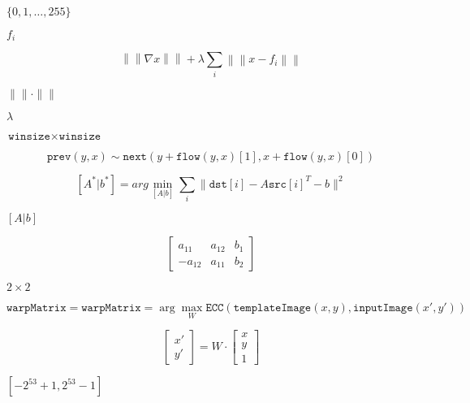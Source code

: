\documentclass{article}
\begin{document}
$\{0,1,\dots,255\}$
\pagebreak

$f_i$
\pagebreak

\[\left\|\left\|\nabla x\right\|\right\| + \lambda\sum_i\left\|\left\|x-f_i\right\|\right\|\]
\pagebreak

$\|\|\cdot\|\|$
\pagebreak

$\lambda$
\pagebreak

$\texttt{winsize}\times\texttt{winsize}$
\pagebreak

\[\texttt{prev} (y,x) \sim \texttt{next} ( y + \texttt{flow} (y,x)[1], x + \texttt{flow} (y,x)[0])\]
\pagebreak

\[[A^*|b^*] = arg \min _{[A|b]} \sum _i \| \texttt{dst}[i] - A { \texttt{src}[i]}^T - b \| ^2\]
\pagebreak

$[A|b]$
\pagebreak

\[\begin{bmatrix} a_{11} & a_{12} & b_1 \\ -a_{12} & a_{11} & b_2 \end{bmatrix}\]
\pagebreak

$2\times 2$
\pagebreak

\[\texttt{warpMatrix} = \texttt{warpMatrix} = \arg\max_{W} \texttt{ECC}(\texttt{templateImage}(x,y),\texttt{inputImage}(x',y'))\]
\pagebreak

\[\begin{bmatrix} x' \\ y' \end{bmatrix} = W \cdot \begin{bmatrix} x \\ y \\ 1 \end{bmatrix}\]
\pagebreak

$[-2^{53}+1, 2^{53}-1]$
\pagebreak
\end{document}
